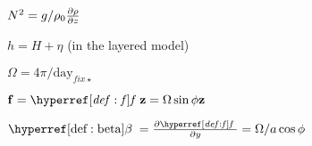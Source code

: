 \begin{multicols}{3}
\begin{definition}\label{def:eta}
 \end{definition}



\begin{definition}\label{def:BVf}
$N^2=g/\rho_0 \frac{\partial\rho}{\partial z}$
 \end{definition}



\begin{definition}\label{def:H}
 \end{definition}



\begin{definition}\label{def:h}
$h = H+\eta$ (in the layered model)
 \end{definition}



\begin{definition}\label{def:Omega}
$\Omega=4\pi/\mathrm{day}_{fix\star}$
 \end{definition}



\begin{definition}\label{def:phi}
 \end{definition}



\begin{definition}\label{def:a}
 \end{definition}



\begin{definition}\label{def:f}
$\vec{f}=\f \vec{z}=\Omega \sin \phi \vec{z}$
 \end{definition}



\begin{definition}\label{def:beta}
$\dfdy=\dpr{\f}{y}=\Omega/a \cos \phi$
 \end{definition}



\end{multicols}
